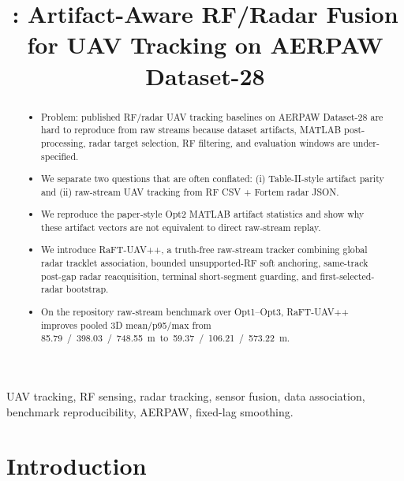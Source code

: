 \documentclass[10pt,conference]{IEEEtran}
\title{\raftpp: Artifact-Aware RF/Radar Fusion for UAV Tracking on AERPAW Dataset-28}
\author{%
  \IEEEauthorblockN{Author One, Author Two, Author Three}
  \IEEEauthorblockA{Affiliation(s) redacted for draft\\
  Email: \texttt{TODO@example.edu}}
}
\newcommand{\raftpp}{RaFT-UAV++\xspace}
\newcommand{\aerpaw}{AERPAW Dataset-28\xspace}
\begin{document}
\maketitle

\begin{abstract}
\begin{itemize}[leftmargin=*,nosep]
  \item Problem: published RF/radar UAV tracking baselines on \aerpaw are hard to reproduce from raw streams because dataset artifacts, MATLAB post-processing, radar target selection, RF filtering, and evaluation windows are under-specified.
  \item We separate two questions that are often conflated: (i) Table-II-style artifact parity and (ii) raw-stream UAV tracking from RF CSV + Fortem radar JSON.
  \item We reproduce the paper-style Opt2 MATLAB artifact statistics and show why these artifact vectors are not equivalent to direct raw-stream replay.
  \item We introduce \raftpp, a truth-free raw-stream tracker combining global radar tracklet association, bounded unsupported-RF soft anchoring, same-track post-gap radar reacquisition, terminal short-segment guarding, and first-selected-radar bootstrap.
  \item On the repository raw-stream benchmark over Opt1--Opt3, \raftpp improves pooled 3D mean/p95/max from \SI{85.79}/\SI{398.03}/\SI{748.55}{m} to \SI{59.37}/\SI{106.21}/\SI{573.22}{m}.
\end{itemize}
\end{abstract}

\begin{IEEEkeywords}
UAV tracking, RF sensing, radar tracking, sensor fusion, data association, benchmark reproducibility, AERPAW, fixed-lag smoothing.
\end{IEEEkeywords}

\section{Introduction}
\label{sec:introduction}
\end{document}
